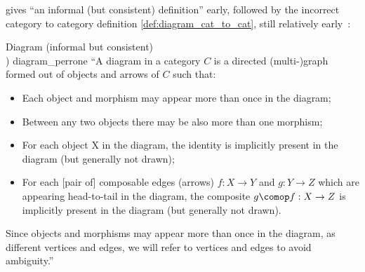 \documentclass[11pt,openany]{book}
\begin{document}
\textcite[p$18/181$]{Perrone:2019:CatTheory}
gives ``an informal (but consistent) definition'' early,
followed by the incorrect category to
category definition \ref{def:diagram_cat_to_cat}, still relatively 
early~\cite[p$53/181$]{Perrone:2019:CatTheory}:

\begin{tcbdefinition}{Diagram (informal but consistent)\\
 \textmd{{\textcite[Definition 1.1.33]{Perrone:2019:CatTheory}}})}
{diagram_perrone}
``A diagram in a category $C$ is a directed (multi-)graph formed 
out of objects and arrows of $C$ such that:
\begin{itemize}
\item Each object and morphism 
may appear more than once in the diagram;
\item Between any two objects 
there may be also more than one morphism;
\item For each object X in the diagram, 
the identity is implicitly present in the diagram (but generally
not drawn);
\item For each {[pair of]} composable edges 
(arrows) $f : X \rightarrow Y$ and $g : Y \rightarrow Z$
which are appearing head-to-tail
in the diagram, the composite $g\comop f : X \rightarrow Z$
 is implicitly present in the diagram (but generally
not drawn).
\end{itemize}
Since objects and morphisms may appear 
more than once in the diagram, as different vertices
and edges, we will refer to vertices and edges to avoid ambiguity.''
\end{tcbdefinition}
\end{document}
